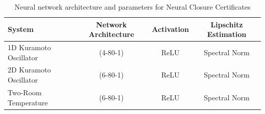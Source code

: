 \begin{table}[h]
\centering
\caption{Neural network architecture and parameters for Neural Closure Certificates}
\label{tab:ncc_config}
\begin{tabular}{lccc}
\hline
\textbf{System} & \textbf{Network Architecture} & \textbf{Activation} & \textbf{Lipschitz Estimation} \\
\hline
1D Kuramoto Oscillator & (4-80-1) & ReLU & Spectral Norm \\
2D Kuramoto Oscillator & (6-80-1) & ReLU & Spectral Norm \\
Two-Room Temperature & (6-80-1) & ReLU & Spectral Norm \\
\hline
\end{tabular}
\end{table}
